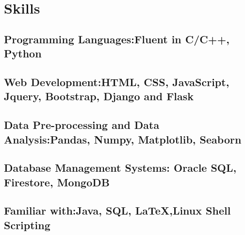 \documentclass{article}
\begin{document}




\section{Skills}

\subsection{\textbf{Programming Languages:}\textmd{Fluent in C/C++, Python }}
\subsection{\textbf{Web Development:}\textmd{HTML, CSS, JavaScript, Jquery, Bootstrap, Django and Flask}}
\subsection{\textbf{Data Pre-processing and Data Analysis:}\textmd{Pandas, Numpy, Matplotlib, Seaborn }}
\subsection{\textbf{Database Management Systems:}\textmd{ Oracle SQL, Firestore, MongoDB }}
\subsection{\textbf{Familiar with:}\textmd{Java, SQL, {\LaTeX},Linux Shell Scripting }}




\end{document}
